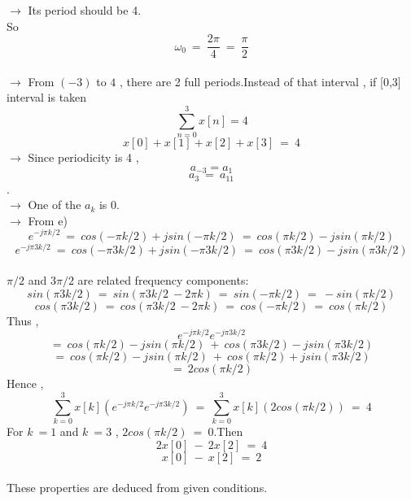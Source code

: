 \documentclass[10pt,a4paper, margin=1in]{article}
\begin{document}
\begin{enumerate}
$\rightarrow$ Its period should be 4.\\
So $$\omega_0\ =\ \frac{2\pi}{4}\ = \ \frac{\pi}{2} $$ \\
$\rightarrow$  From $(-3)$ to $4$ , there are 2 full periods.Instead of that interval , if [0,3] interval is taken \\
$$\sum_{n=0}^{3} x[n] = 4$$
$$ x[0]+x[1]+x[2]+x[3] \ = \ 4$$
$\rightarrow$ Since periodicity is 4 , $$a_{-3} = a_{1}$$ $$a_{3} \ = \ a_{11}$$.\\
$\rightarrow$ One of the $a_{k}$ is 0. \\
$\rightarrow$ From e) $$ e^{-j\pi k/2}\ = \ cos(-\pi k/2) +jsin(-\pi k/2) \ = \ cos(\pi k/2) -jsin(\pi k/2) $$ 
$$ e^{-j\pi 3k/2}\ = \ cos(-\pi 3k/2) +jsin(-\pi 3k/2) \ = \ cos(\pi 3k/2) -jsin(\pi 3k/2) $$\\
$\pi/2 $ and $3\pi /2$ are related frequency components:
$$ sin(\pi 3k/2) \ = \ sin(\pi 3k/2 \ -2\pi k) \ = \ sin(-\pi k/2) \ = \ -sin(\pi k/2) $$
$$ cos(\pi 3k/2) \ = \ cos(\pi 3k/2 \ -2\pi k) \ = \ cos(-\pi k/2) \ = \ cos(\pi k/2) $$
Thus , $$e^{-j\pi k/2} e^{-j\pi 3k/2} $$ 
$$ = \ cos(\pi k/2) -jsin(\pi k/2)\ + \ cos(\pi 3k/2) -jsin(\pi 3k/2) $$
$$ = \ cos(\pi k/2) -jsin(\pi k/2)\ + \ cos(\pi k/2) +jsin(\pi 3k/2) $$
$$ = \ 2cos(\pi k/2) $$
Hence , 
$$\sum_{k=0}^{3} x[k](e^{-j\pi k/2} e^{-j\pi 3k/2})\ =\ \sum_{k=0}^{3} x[k](2cos(\pi k/2))\ = \ 4 $$
For $k\ =1$ and $k\ =3$ , $2cos(\pi k/2)\ = \ 0$.Then \\
$$2x[0]\ - \ 2x[2] \ = \ 4$$
$$x[0]\ - \ x[2] \ = \ 2$$\\

These properties are deduced from given conditions.\\\\


\end{enumerate}
\end{document}
